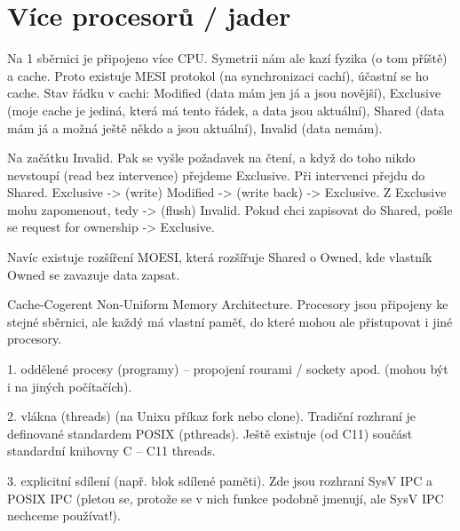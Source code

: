 \documentclass[12pt]{article}                   %
\begin{document}
\section{Více procesorů / jader}
        \begin{definice}
            Na 1 sběrnici je připojeno více CPU. Symetrii nám ale kazí fyzika (o tom příště) a cache. Proto existuje MESI protokol (na synchronizaci cachí), účastní se ho cache. Stav řádku v cachi: Modified (data mám jen já a jsou novější), Exclusive (moje cache je jediná, která má tento řádek, a data jsou aktuální), Shared (data mám já a možná ještě někdo a jsou aktuální), Invalid (data nemám).

            Na začátku Invalid. Pak se vyšle požadavek na čtení, a když do toho nikdo nevstoupí (read bez intervence) přejdeme Exclusive. Při intervenci přejdu do Shared. Exclusive -> (write) Modified -> (write back) -> Exclusive. Z Exclusive mohu zapomenout, tedy -> (flush) Invalid. Pokud chci zapisovat do Shared, pošle se request for ownership -> Exclusive.

            Navíc existuje rozšíření MOESI, která rozšířuje Shared o Owned, kde vlastník Owned se zavazuje data zapsat.
        \end{definice}


        \begin{definice}[cc/NUMA]
            Cache-Cogerent Non-Uniform Memory Architecture. Procesory jsou připojeny ke stejné sběrnici, ale každý má vlastní paměť, do které mohou ale přistupovat i jiné procesory.
        \end{definice}

        \begin{definice}
            1. oddělené procesy (programy) -- propojení rourami / sockety apod. (mohou být i na jiných počítačích).

            2. vlákna (threads) (na Unixu příkaz fork nebo clone). Tradiční rozhraní je definované standardem POSIX (pthreads). Ještě existuje (od C11) součást standardní knihovny C -- C11 threads.

            3. explicitní sdílení (např. blok sdílené paměti). Zde jsou rozhraní SysV IPC a POSIX IPC (pletou se, protože se v nich funkce podobně jmenují, ale SysV IPC nechceme používat!).
        \end{definice}
\end{document}
